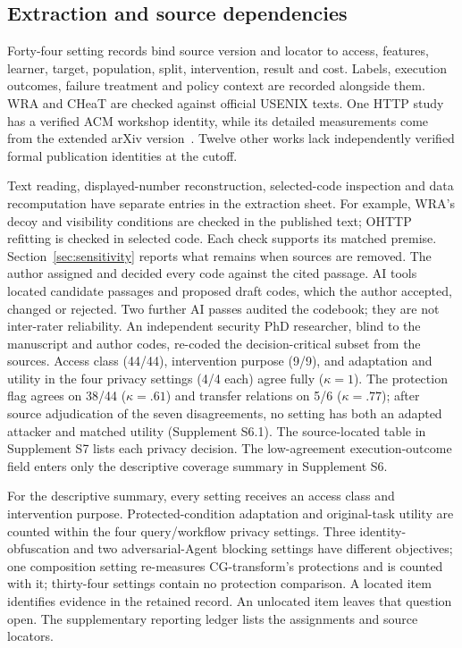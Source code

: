 \subsection{Extraction and source dependencies}
Forty-four setting records bind source version and locator to access, features, learner, target, population, split, intervention, result and cost. Labels, execution outcomes, failure treatment and policy context are recorded alongside them. WRA and CHeaT are checked against official USENIX texts. One HTTP study has a verified ACM workshop identity, while its detailed measurements come from the extended arXiv version~\cite{borysenko2026http,borysenko2026short}. Twelve other works lack independently verified formal publication identities at the cutoff.

Text reading, displayed-number reconstruction, selected-code inspection and data recomputation have separate entries in the extraction sheet. For example, WRA's decoy and visibility conditions are checked in the published text; OHTTP refitting is checked in selected code. Each check supports its matched premise. Section~\ref{sec:sensitivity} reports what remains when sources are removed. The author assigned and decided every code against the cited passage. AI tools located candidate passages and proposed draft codes, which the author accepted, changed or rejected. Two further AI passes audited the codebook; they are not inter-rater reliability. An independent security PhD researcher, blind to the manuscript and author codes, re-coded the decision-critical subset from the sources. Access class (44/44), intervention purpose (9/9), and adaptation and utility in the four privacy settings (4/4 each) agree fully ($\kappa=1$). The protection flag agrees on 38/44 ($\kappa=.61$) and transfer relations on 5/6 ($\kappa=.77$); after source adjudication of the seven disagreements, no setting has both an adapted attacker and matched utility (Supplement S6.1). The source-located table in Supplement S7 lists each privacy decision. The low-agreement execution-outcome field enters only the descriptive coverage summary in Supplement S6.

For the descriptive summary, every setting receives an access class and intervention purpose. Protected-condition adaptation and original-task utility are counted within the four query/workflow privacy settings. Three identity-obfuscation and two adversarial-Agent blocking settings have different objectives; one composition setting re-measures CG-transform's protections and is counted with it; thirty-four settings contain no protection comparison. A located item identifies evidence in the retained record. An unlocated item leaves that question open. The supplementary reporting ledger lists the assignments and source locators.

